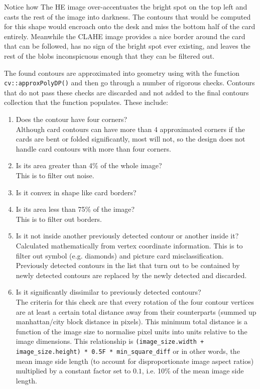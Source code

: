 \documentclass[a4paper,12pt,notitlepage]{article}
\newcommand{\code}[1]{\lstinline[basicstyle=\ttfamily,breakautoindent=false,postbreak={}]|#1|}
\begin{document}
			Notice how The HE image over-accentuates the bright spot on the top left and casts the rest of the image into darkness. The contours that would be computed for this shape would encroach onto the desk and miss the bottom half of the card entirely. Meanwhile the CLAHE image provides a nice border around the card that can be followed, has no sign of the bright spot ever existing, and leaves the rest of the blobs inconspicuous enough that they can be filtered out.

			The found contours are approximated into geometry using with the function\\\code{cv::approxPolyDP()} and then go through a number of rigorous checks. Contours that do not pass these checks are discarded and not added to the final contours collection that the function populates. These include:

			\begin{enumerate}
				\item Does the contour have four corners?\\[4px]
					Although card contours can have more than 4 approximated corners if the cards are bent or folded significantly, most will not, so the design does not handle card contours with more than four corners.
				\item Is its area greater than 4\% of the whole image?\\[4px]
					This is to filter out noise.
				\item Is it convex in shape like card borders?
				\item Is its area less than 75\% of the image?\\[4px]
					This is to filter out borders.
				\item Is it not inside another previously detected contour or another inside it?\\[4px]
					Calculated mathematically from vertex coordinate information. This is to filter out symbol (e.g. diamonds) and picture card misclassification. Previously detected contours in the list that turn out to be contained by newly detected contours are replaced by the newly detected and discarded.
				\item Is it significantly dissimilar to previously detected contours?\\[4px]
					The criteria for this check are that every rotation of the four contour vertices are at least a certain total distance away from their counterparts (summed up manhattan/city block distance in pixels). This minimum total distance is a function of the image size to normalise pixel units into units relative to the image dimensions. This relationship is \code{(image_size.width + image_size.height) * 0.5F * min_square_diff} or in other words, the mean image side length (to account for disproportionate image aspect ratios) multiplied by a constant factor set to $0.1$, i.e. 10\% of the mean image side length.
			\end{enumerate}
\end{document}
